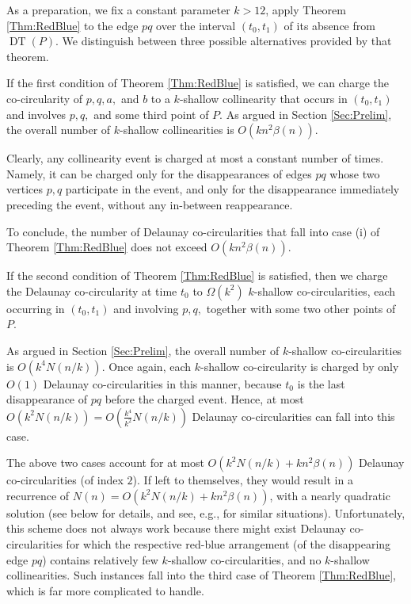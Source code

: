 \documentclass[letter,11pt]{article}
\def\DT{\mathop{\mathrm{DT}}}
\begin{document}
As a preparation, we fix a constant parameter $k>12$, apply Theorem \ref{Thm:RedBlue} to the edge $pq$ over the interval $(t_0,t_1)$ of its absence from $\DT(P)$. We distinguish between three possible alternatives provided by that theorem.

\smallskip
{} If the first condition of Theorem \ref{Thm:RedBlue} is satisfied, we can charge the co-circularity of $p,q,a,$ and $b$ to a $k$-shallow collinearity that occurs in $(t_0,t_1)$ and involves $p,q,$ and some third point of $P$. As argued in Section \ref{Sec:Prelim}, the overall number of $k$-shallow collinearities is $O(kn^2\beta(n))$.

Clearly, any collinearity event is charged at most a constant number of times. Namely, it can be charged only for the disappearances of edges $pq$ whose two vertices $p,q$ participate in the event, and only for the disappearance immediately preceding the event, without any in-between reappearance.

To conclude, the number of Delaunay co-circularities that fall into case (i) of Theorem \ref{Thm:RedBlue} does not exceed $O(kn^2\beta(n))$.

\smallskip
{} If the second condition of Theorem \ref{Thm:RedBlue} is satisfied, then we charge the Delaunay co-circularity at time $t_0$ to $\Omega(k^2)$ $k$-shallow co-circularities, each occurring in $(t_0,t_1)$ and involving $p,q,$ together with some two other points of $P$.

As argued in Section \ref{Sec:Prelim}, the overall number of $k$-shallow co-circularities is $O(k^4 N(n/k))$. Once again, each $k$-shallow co-circularity is charged by only $O(1)$ Delaunay co-circularities in this manner, because $t_0$ is the last disappearance of $pq$ before the charged event. Hence, at most $O(k^2N(n/k))=O\left(\frac{k^4}{k^2}N(n/k)\right)$ Delaunay co-circularities can fall into this case.

The above two cases account for at most $O(k^2N(n/k)+kn^2\beta(n))$ Delaunay co-circularities (of index $2$). If left to themselves, they would result in a recurrence of $N(n)=O(k^2N(n/k)+kn^2\beta(n))$, with a nearly quadratic solution (see below for details, and see, e.g., \cite{ASS} for similar situations).
Unfortunately, this scheme does not always work because there might exist Delaunay co-circularities for which the respective red-blue arrangement (of the disappearing edge $pq$) contains relatively few $k$-shallow co-circularities, and no $k$-shallow collinearities.
Such instances fall into the third case of Theorem \ref{Thm:RedBlue}, which is far more complicated to handle.
\end{document}
